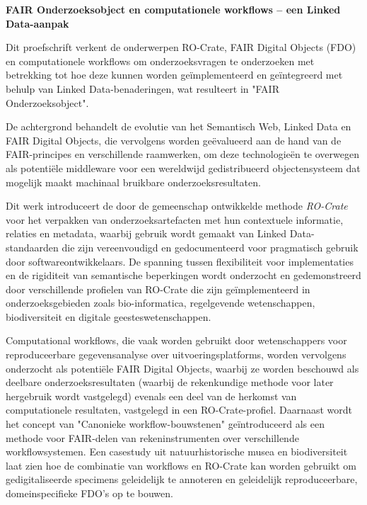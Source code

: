 \textbf{FAIR Onderzoeksobject en computationele workflows – een Linked Data-aanpak}


Dit proefschrift verkent de onderwerpen RO-Crate, FAIR Digital Objects (FDO) en computationele workflows om onderzoeksvragen te onderzoeken met betrekking tot hoe deze kunnen worden geïmplementeerd en geïntegreerd met behulp van Linked Data-benaderingen, wat resulteert in "FAIR Onderzoeksobject".

De achtergrond behandelt de evolutie van het Semantisch Web, Linked Data en FAIR Digital Objects, die vervolgens worden geëvalueerd aan de hand van de FAIR-principes en verschillende raamwerken, om deze technologieën te overwegen als potentiële middleware voor een wereldwijd gedistribueerd objectensysteem dat mogelijk maakt machinaal bruikbare onderzoeksresultaten.

Dit werk introduceert de door de gemeenschap ontwikkelde methode \emph{RO-Crate} voor het verpakken van onderzoeksartefacten met hun contextuele informatie, relaties en metadata, waarbij gebruik wordt gemaakt van Linked Data-standaarden die zijn vereenvoudigd en gedocumenteerd voor pragmatisch gebruik door softwareontwikkelaars. De spanning tussen flexibiliteit voor implementaties en de rigiditeit van semantische beperkingen wordt onderzocht en gedemonstreerd door verschillende profielen van RO-Crate die zijn geïmplementeerd in onderzoeksgebieden zoals bio-informatica, regelgevende wetenschappen, biodiversiteit en digitale geesteswetenschappen. 

Computational workflows, die vaak worden gebruikt door wetenschappers voor reproduceerbare gegevensanalyse over uitvoeringsplatforms, worden vervolgens onderzocht als potentiële FAIR Digital Objects, waarbij ze worden beschouwd als deelbare onderzoeksresultaten (waarbij de rekenkundige methode voor later hergebruik wordt vastgelegd) evenals een deel van de herkomst van computationele resultaten, vastgelegd in een RO-Crate-profiel. Daarnaast wordt het concept van "Canonieke workflow-bouwstenen" geïntroduceerd als een methode voor FAIR-delen van rekeninstrumenten over verschillende workflowsystemen. Een casestudy uit natuurhistorische musea en biodiversiteit laat zien hoe de combinatie van workflows en RO-Crate kan worden gebruikt om gedigitaliseerde specimens geleidelijk te annoteren en geleidelijk reproduceerbare, domeinspecifieke FDO's op te bouwen.

